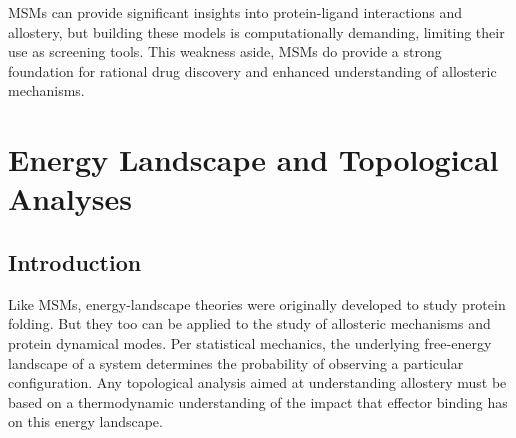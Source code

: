 \par MSMs can provide significant insights into protein-ligand interactions and allostery, but building these models is computationally demanding, limiting their use as screening tools. This weakness aside, MSMs do provide a strong foundation for rational drug discovery and enhanced understanding of allosteric mechanisms.


\section{Energy Landscape and Topological Analyses}
\subsection{Introduction}
\par Like MSMs, energy-landscape theories were originally developed to study protein folding. But they too can be applied to the study of allosteric mechanisms and protein dynamical modes. Per statistical mechanics, the underlying free-energy landscape of a system determines the probability of observing a particular configuration. Any topological analysis aimed at understanding allostery must be based on a thermodynamic understanding of the impact that effector binding has on this energy landscape.
